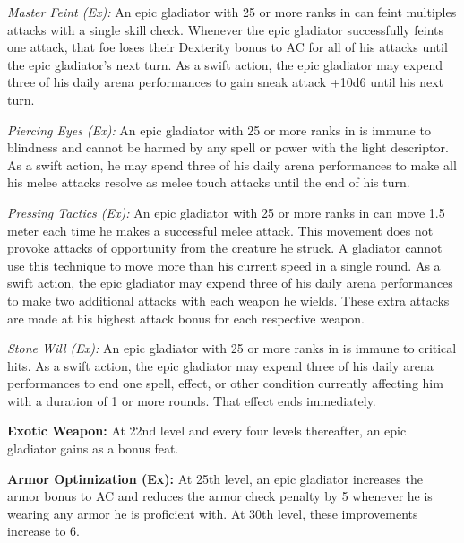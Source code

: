 \textit{Master Feint (Ex):} An epic gladiator with 25 or more ranks in  can feint multiples attacks with a single skill check. Whenever the epic gladiator successfully feints one attack, that foe loses their Dexterity bonus to AC for all of his attacks until the epic gladiator's next turn. As a swift action, the epic gladiator may expend three of his daily arena performances to gain sneak attack +10d6 until his next turn.

\textit{Piercing Eyes (Ex):} An epic gladiator with 25 or more ranks in  is immune to blindness and cannot be harmed by any spell or power with the light descriptor. As a swift action, he may spend three of his daily arena performances to make all his melee attacks resolve as melee touch attacks until the end of his turn.

\textit{Pressing Tactics (Ex):} An epic gladiator with 25 or more ranks in  can move 1.5 meter each time he makes a successful melee attack. This movement does not provoke attacks of opportunity from the creature he struck. A gladiator cannot use this technique to move more than his current speed in a single round. As a swift action, the epic gladiator may expend three of his daily arena performances to make two additional attacks with each weapon he wields. These extra attacks are made at his highest attack bonus for each respective weapon.

\textit{Stone Will (Ex):} An epic gladiator with 25 or more ranks in  is immune to critical hits. As a swift action, the epic gladiator may expend three of his daily arena performances to end one spell, effect, or other condition currently affecting him with a duration of 1 or more rounds. That effect ends immediately.

\textbf{Exotic Weapon:} At 22nd level and every four levels thereafter, an epic gladiator gains  as a bonus feat.

\textbf{Armor Optimization (Ex):} At 25th level, an epic gladiator increases the armor bonus to AC and reduces the armor check penalty by 5 whenever he is wearing any armor he is proficient with. At 30th level, these improvements increase to 6.
